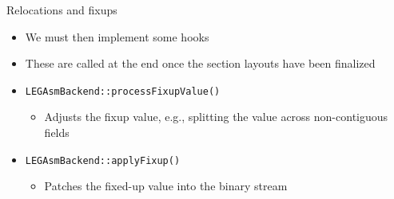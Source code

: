 
\begin{frame}{Relocations and fixups}

\begin{itemize}
    \item We must then implement some hooks
    \item These are called at the end once the section layouts have been finalized
    \item \texttt{LEGAsmBackend::processFixupValue()}
    \begin{itemize}
        \item Adjusts the fixup value, e.g., splitting the value across non-contiguous fields
    \end{itemize}
    \item \texttt{LEGAsmBackend::applyFixup()}
    \begin{itemize}
        \item Patches the fixed-up value into the binary stream
    \end{itemize}
\end{itemize}

\end{frame}



